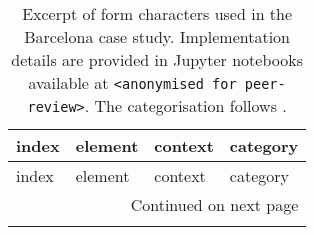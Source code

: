 \begin{small}
\begin{longtable}{p{5cm}p{4cm}p{4cm}l}
\caption{Excerpt of form characters used in the Barcelona case study. Implementation details are provided
in Jupyter notebooks available at \texttt{<anonymised for peer-review>}. The categorisation follows \cite{fleischmann2020measuring}.}
\label{tab:bcn_form_excerpt} \\
\toprule
                               index &                         element &                    context &     category \\
\midrule
\endfirsthead

\toprule
                               index &                         element &                    context &     category \\
\midrule
\endhead
\midrule
\multicolumn{4}{r}{{Continued on next page}} \\
\midrule
\endfoot


\end{longtable}
\end{small}
